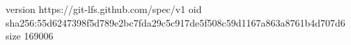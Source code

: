 version https://git-lfs.github.com/spec/v1
oid sha256:55d6247398f5d789e2bc7fda29c5c917de5f508c59d1167a863a8761b4d707d6
size 169006
